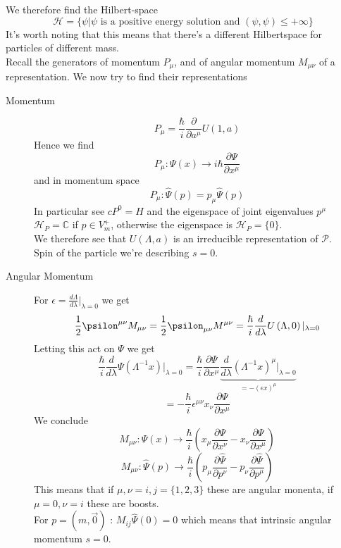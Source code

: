 \documentclass{report}
\begin{document}
We therefore find the Hilbert-space \[
  \mathcal{H} = \{ \psi | \psi \text{ is a positive energy solution and } \left( \psi, \psi \right) \le +\infty \}
\] 
It's worth noting that this means that there's a different Hilbertspace for particles of different mass.\\
Recall the generators of momentum $P_\mu$, and of angular momentum $M_{\mu \nu}$ of a representation. We now try to find their representations
\begin{description}
  \item[Momentum] \[
      P_\mu = \frac{\hbar}{i} \frac{\partial }{\partial a^\mu } U\left( 1, a \right) 
  \] Hence we find \[
  P_\mu: \Psi\left( x \right) \to i \hbar \frac{\partial \Psi}{\partial x^\mu } 
  \] and in momentum space \[
  P_\mu: \hat{\Psi}\left( p \right) = p_\mu \hat{\Psi}\left( p \right) 
\] In particular see $cP^0 = H$ and the eigenspace of joint eigenvalues $p^\mu$ $\mathcal{H}_P = \mathbb{C}$ if $p \in V^+_m$, otherwise the eigenspace is  $\mathcal{H}_P = \{0\}$.\\
We therefore see that $U\left( \Lambda, a \right) $ is an irreducible representation of $\mathcal{P}$.\\
Spin of the particle we're describing $s = 0$.
\item[Angular Momentum]
  For $\epsilon = \frac{d\Lambda}{d \lambda}|_{\lambda = 0}$ we get \[
    \frac{1}{2} \psilon^{\mu \nu} M_{\mu\nu} = \frac{1}{2} \psilon_{\mu \nu} M^{\mu\nu} = \frac{\hbar}{i} \frac{d}{d\lambda} U\left( \Lambda,0 \right) |_{\lambda=0}
  \] Letting this act on $\Psi$ we get \[
  \frac{\hbar}{i} \frac{d}{d\lambda} \Psi\left( \Lambda^{-1} x \right) |_{\lambda = 0} = \frac{\hbar}{i} \frac{\partial \Psi  }{\partial x^\mu } \underbrace{\frac{d}{d \lambda} \left( \Lambda^{-1} x \right)^\mu |_{\lambda = 0}}_{= -\left( \epsilon x \right) ^\mu}
  \] \[
  = -\frac{\hbar}{i} \epsilon^{\mu \nu} x_\nu \frac{\partial \Psi }{\partial x^\mu }
  \] We conclude \[
  M_{\mu \nu}: \Psi\left( x \right) \to \frac{\hbar}{i} \left( x_\mu \frac{\partial \Psi }{\partial x^\nu } - x_{\nu} \frac{\partial \Psi }{\partial x^\mu } \right) 
  \] \[
  M_{\mu \nu}: \hat{\Psi}\left( p \right) \to \frac{\hbar}{i} \left( p_\mu \frac{\partial \hat{\Psi} }{\partial p^\nu } - p_\nu \frac{\partial \hat{\Psi} }{\partial p^\mu } \right) 
\] This means that if $\mu, \nu = i,j = \{1,2,3\}$ these are angular monenta, if $\mu = 0, \nu = i$ these are boosts.\\
For $p = \left( m, \vec{0} \right) $ : $M_{ij}\hat{\Psi}\left( 0 \right) = 0 $ which means that intrinsic angular momentum $s = 0$.
\end{description}
\end{document}
